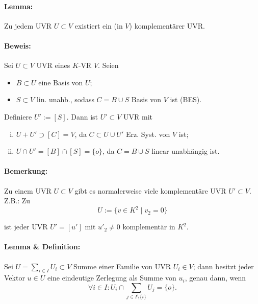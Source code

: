 \paragraph{Lemma: }
	Zu jedem UVR $ U\subset V $ existiert ein (in $ V $) komplementärer UVR.
	
\paragraph{Beweis: }
	Sei $ U\subset V $ UVR eines $ K $-VR $ V $.
	Seien 
		\begin{itemize}
		\item $ B\subset U $ eine Basis von $ U $;
		\item $ S\subset V $ lin. unahb., sodass $ C=B\cup S $ Basis von $ V $ ist (BES).
		\end{itemize}
	
	Definiere $ U':= [S] $. Dann ist $ U'\subset V $ UVR mit
		\begin{enumerate}[(i)]
		\item $ U+U' \supset [C] = V $, da $ C\subset U\cup U' $ Erz. Syst. von $ V $ ist;
		\item $ U\cap U' = [B]\cap [S] = \{o\}$, da $ C=B\cup S $ linear unabhängig ist.
		\end{enumerate}
\paragraph{Bemerkung: }
	Zu einem UVR $ U\subset V $ gibt es normalerweise viele komplementäre UVR $ U'\subset V $.
	Z.B.: Zu
		\begin{equation*}
		U:= \{v\in K^2\mid v_2 = 0\}
		\end{equation*}
	
	ist jeder UVR $ U' = [u']$ mit $u'_2\neq 0 $ komplementär in $ K^2 $.
	
\paragraph{Lemma \& Definition: }
	Sei $ U= \sum_{i\in I}U_i\subset V $ Summe einer Familie von UVR $ U_i\in V $; dann besitzt jeder Vektor $ u\in U $ eine eindeutige Zerlegung als Summe von $ u_i $, genau dann, wenn
		\begin{equation*}
		\forall i\in I: U_i\cap \sum_{j\in I\setminus \{i\}}U_j = \{o\}.
		\end{equation*}
		

